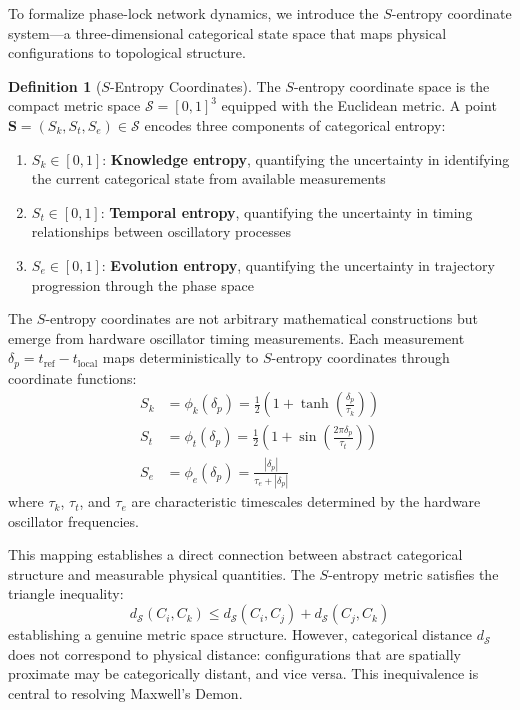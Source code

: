 \documentclass[twocolumn,showpacs,preprintnumbers,amsmath,amssymb,prd]{revtex4-2}
\theoremstyle{definition}
\newtheorem{definition}[theorem]{Definition}
\theoremstyle{remark}
\newcommand{\Sspace}{\mathcal{S}}
\newcommand{\Sk}{S_k}
\newcommand{\St}{S_t}
\newcommand{\Se}{S_e}
\newcommand{\Scoord}{\mathbf{S}}
\begin{document}
To formalize phase-lock network dynamics, we introduce the $S$-entropy coordinate system---a three-dimensional categorical state space that maps physical configurations to topological structure.

\begin{definition}[$S$-Entropy Coordinates]
\label{def:s_entropy}
The $S$-entropy coordinate space is the compact metric space $\Sspace = [0,1]^3$ equipped with the Euclidean metric. A point $\Scoord = (\Sk, \St, \Se) \in \Sspace$ encodes three components of categorical entropy:
\begin{enumerate}
\item $\Sk \in [0,1]$: \textbf{Knowledge entropy}, quantifying the uncertainty in identifying the current categorical state from available measurements
\item $\St \in [0,1]$: \textbf{Temporal entropy}, quantifying the uncertainty in timing relationships between oscillatory processes
\item $\Se \in [0,1]$: \textbf{Evolution entropy}, quantifying the uncertainty in trajectory progression through the phase space
\end{enumerate}
\end{definition}

The $S$-entropy coordinates are not arbitrary mathematical constructions but emerge from hardware oscillator timing measurements. Each measurement $\delta_p = t_{\text{ref}} - t_{\text{local}}$ maps deterministically to $S$-entropy coordinates through coordinate functions:
\begin{align}
\Sk &= \phi_k(\delta_p) = \frac{1}{2}\left(1 + \tanh\left(\frac{\delta_p}{\tau_k}\right)\right) \label{eq:phi_k} \\
\St &= \phi_t(\delta_p) = \frac{1}{2}\left(1 + \sin\left(\frac{2\pi \delta_p}{\tau_t}\right)\right) \label{eq:phi_t} \\
\Se &= \phi_e(\delta_p) = \frac{|\delta_p|}{\tau_e + |\delta_p|} \label{eq:phi_e}
\end{align}
where $\tau_k$, $\tau_t$, and $\tau_e$ are characteristic timescales determined by the hardware oscillator frequencies.

This mapping establishes a direct connection between abstract categorical structure and measurable physical quantities. The $S$-entropy metric satisfies the triangle inequality:
\begin{equation}
d_{\Sspace}(C_i, C_k) \leq d_{\Sspace}(C_i, C_j) + d_{\Sspace}(C_j, C_k)
\label{eq:triangle}
\end{equation}
establishing a genuine metric space structure. However, categorical distance $d_{\Sspace}$ does not correspond to physical distance: configurations that are spatially proximate may be categorically distant, and vice versa. This inequivalence is central to resolving Maxwell's Demon.
\end{document}
